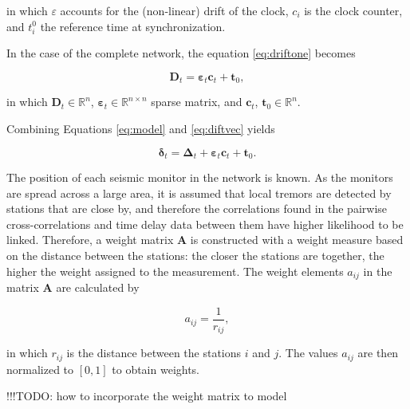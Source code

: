 \documentclass[12pt,a4paper,english]{article}
\newcommand\todo[1]{{\color{red}!!!TODO: #1}}
\begin{document}
in which $\varepsilon$ accounts for the (non-linear) drift of the clock, $c_i$ is the clock counter, and $t_i^0$ the reference time at synchronization.

In the case of the complete network, the equation \ref{eq:driftone} becomes

\begin{equation}
\mathbf{D}_t = \bm{\varepsilon}_t \mathbf{c}_t + \mathbf{t}_0,
\label{eq:diftvec}
\end{equation}

in which $\mathbf{D}_t \in \mathbb{R}^{n}$, $\bm{\varepsilon}_t\in\mathbb{R}^{n \times n}$ sparse matrix, and $\mathbf{c}_t$, $\mathbf{t}_0 \in \mathbb{R}^n$. 

Combining Equations \ref{eq:model} and  \ref{eq:diftvec} yields

\begin{equation}
\bm{\delta}_t  = \bm{\Delta}_t + \bm{\varepsilon}_t \mathbf{c}_t + \mathbf{t}_0. 
\label{eq:modelwithdrift}
\end{equation}

The position of each seismic monitor in the network is known. As the monitors are spread across a large area, it is assumed that local tremors are detected by stations that are close by, and therefore the correlations found in the pairwise cross-correlations and time delay data between them have higher likelihood to be linked. Therefore, a weight matrix $\mathbf{A}$ is constructed with a weight measure based on the distance between the stations: the closer the stations are together, the higher the weight assigned to the measurement. The weight elements $a_{ij}$ in the matrix $\mathbf{A}$ are calculated by 

\begin{equation}
a_{ij} = \frac{1}{r_{ij}},
\end{equation}

in which $r_{ij}$ is the distance between the stations $i$ and $j$. The values $a_{ij}$ are then normalized to $[0,1]$ to obtain weights. 

\todo{how to incorporate the weight matrix to model}
\end{document}
